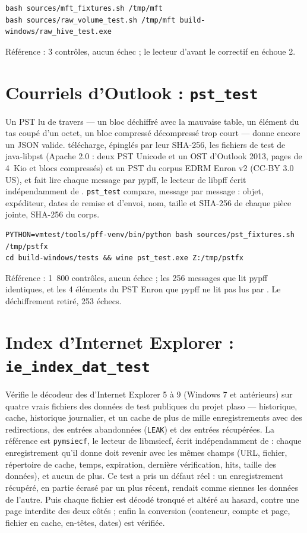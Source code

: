\documentclass[11pt,a4paper,oneside]{report}
\begin{document}
\begin{lstlisting}
bash sources/mft_fixtures.sh /tmp/mft
bash sources/raw_volume_test.sh /tmp/mft build-windows/raw_hive_test.exe
\end{lstlisting}

Référence : 3 contrôles, aucun échec ; le lecteur d'avant le correctif en
échoue 2.

\section{Courriels d'Outlook : \texttt{pst\_test}}

Un PST lu de travers — un bloc déchiffré avec la mauvaise table, un élément du
tas coupé d'un octet, un bloc compressé décompressé trop court — donne encore
un JSON valide.  télécharge, épinglés par leur
SHA-256, les fichiers de test de java-libpst (Apache 2.0 : deux PST Unicode et
un OST d'Outlook 2013, pages de 4~Kio et blocs compressés) et un PST du corpus
EDRM Enron v2 (CC-BY 3.0 US), et fait lire chaque message par pypff, le lecteur
de libpff écrit indépendamment de \wac{}. \texttt{pst\_test} compare, message
par message : objet, expéditeur, dates de remise et d'envoi, nom, taille et
SHA-256 de chaque pièce jointe, SHA-256 du corps.

\begin{lstlisting}
PYTHON=vmtest/tools/pff-venv/bin/python bash sources/pst_fixtures.sh /tmp/pstfx
cd build-windows/tests && wine pst_test.exe Z:/tmp/pstfx
\end{lstlisting}

Référence : 1~800 contrôles, aucun échec ; les 256 messages que lit pypff
identiques, et les 4 éléments du PST Enron que pypff ne lit pas lus par
\wac{}. Le déchiffrement retiré, 253 échecs.

\section{Index d'Internet Explorer : \texttt{ie\_index\_dat\_test}}

Vérifie le décodeur des  d'Internet Explorer 5 à 9
(Windows 7 et antérieurs) sur quatre vrais fichiers des données de test
publiques du projet plaso — historique, cache, historique journalier, et un
cache de plus de mille enregistrements avec des redirections, des entrées
abandonnées (\texttt{LEAK}) et des entrées récupérées. La référence est
\texttt{pymsiecf}, le lecteur de libmsiecf, écrit indépendamment de \wac{} :
chaque enregistrement qu'il donne doit revenir avec les mêmes champs (URL,
fichier, répertoire de cache, temps, expiration, dernière vérification, hits,
taille des données), et aucun de plus. Ce test a pris un défaut réel : un
enregistrement récupéré, en partie écrasé par un plus récent, rendait comme
siennes les données de l'autre. Puis chaque fichier est décodé tronqué et
altéré au hasard, contre une page interdite des deux côtés ; enfin la
conversion (conteneur, compte et page, fichier en cache, en-têtes, dates)
est vérifiée.
\end{document}
